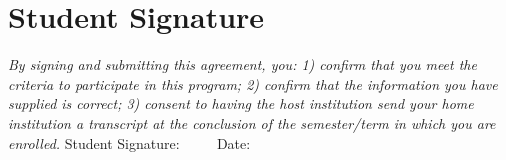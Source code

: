 \documentclass[10pt]{article}
\begin{document}
\section*{Student Signature}
\textit {By signing and submitting this agreement, you: 1) confirm that you meet the criteria to participate in this program; 2) confirm that the information you have supplied is correct; 3) consent to having the host institution send your home institution a transcript at the conclusion of the semester/term in which you are enrolled.}
\newline
Student Signature: \hrulefill $\qquad$ Date: \hrulefill $\qquad$
\end{document}
